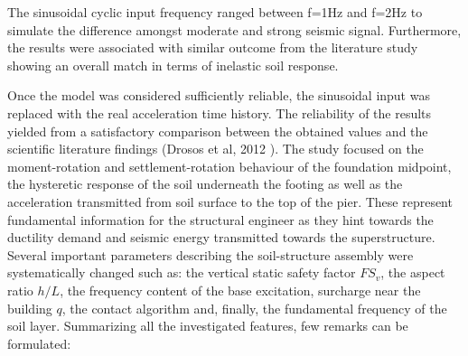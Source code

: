The sinusoidal cyclic input frequency ranged between f=1Hz and f=2Hz to simulate the difference amongst moderate and strong seismic signal. Furthermore, the results were associated with similar outcome from the literature study showing an overall match in terms of inelastic soil response.

Once the model was considered sufficiently reliable, the sinusoidal input was replaced with the real acceleration time history. The reliability of the results yielded from a satisfactory comparison between the obtained values and the scientific literature findings (Drosos et al, 2012 \cite{drosos2012soil}). The study focused on the moment-rotation and settlement-rotation behaviour of the foundation midpoint, the hysteretic response of the soil underneath the footing as well as the acceleration transmitted from soil surface to the top of the pier. These represent fundamental information for the structural engineer as they hint towards the ductility demand and seismic energy transmitted towards the superstructure. Several important parameters describing the soil-structure assembly were systematically changed such as: the vertical static safety factor $FS_v$, the aspect ratio $h/L$, the frequency content of the base excitation, surcharge near the building $q$, the contact algorithm and, finally, the fundamental frequency of the soil layer. Summarizing all the investigated features, few remarks can be formulated:

